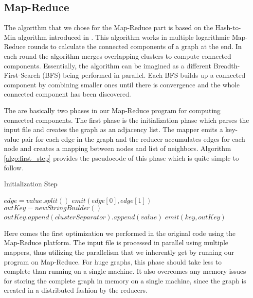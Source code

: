 \subsection{Map-Reduce}

The algorithm that we chose for the Map-Reduce part is based on the Hash-to-Min algorithm introduced in \cite{rastogi}. This algorithm works in multiple logarithmic Map-Reduce rounds  to calculate the connected components of a graph at the end. In each round the algorithm merges overlapping clusters to compute connected components. Essentially, the algorithm can be imagined as a different Breadth-First-Search (\eg BFS) being performed in parallel. Each BFS builds up a connected component by combining smaller ones until there is convergence and the whole connected component has been discovered.

The are basically two phases in our Map-Reduce program for computing connected components. The first phase is the initialization phase which parses the input file and creates the graph as an adjacency list. The mapper emits a key-value pair for each edge in the graph and the reducer accumulates edges for each node and creates a mapping between nodes and list of neighbors. Algorithm \ref{algo:first_step} provides the pseudocode of this phase which is quite simple to follow.

\begin{algorithm}[!h]
	\caption{Initialization Step}
	\label{algo:first_step}
	\begin{algorithmic}[1]
			\State $edge = value.split() $
			\State $emit(edge[0], edge[1])$
		\EndFunction
			\State $outKey = new StringBuilder()$
				\State $outKey.append(clusterSeparator).append(value)$
			\EndFor
			\State $emit(key, outKey)$
		\EndFunction
	\end{algorithmic}
\end{algorithm}

Here comes the first optimization we performed in the original code using the Map-Reduce platform. The input file is processed in parallel using multiple mappers, thus utilizing the parallelism that we inherently get by running our program on Map-Reduce. For huge graphs, this phase should take less to complete than running on a single machine. It also overcomes any memory issues for storing the complete graph in memory on a single machine, since the graph is created in a distributed fashion by the reducers.

